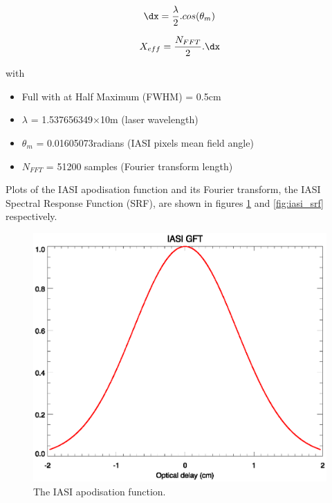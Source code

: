 \begin{equation}
  \dx = \frac{\lambda}{2}.cos(\theta_{m})
  \label{eqn:dx_eff}
\end{equation}

\begin{equation}
  X_{eff} = \frac{N_{FFT}}{2}.\dx
  \label{eqn:x_eff}
\end{equation}

with
\begin{itemize}
  \item{Full with at Half Maximum (FWHM) = 0.5cm}
  \item{$\lambda$ = 1.537656349$\times$10m (laser wavelength)}
  \item{$\theta_{m}$ = 0.01605073radians (IASI pixels mean field angle)}
  \item{$N_{FFT}$ = 51200 samples (Fourier transform length)}
\end{itemize}

Plots of the IASI apodisation function and its Fourier transform, the IASI Spectral Response Function (SRF), are shown in figures \ref{fig:iasi_gft} and \ref{fig:iasi_srf} respectively.

\begin{figure}[htp]
  \centering
  \includegraphics[scale=0.8]{graphics/IASI_GFT.eps}
  \caption{The IASI apodisation function.}
  \label{fig:iasi_gft}
\end{figure}

